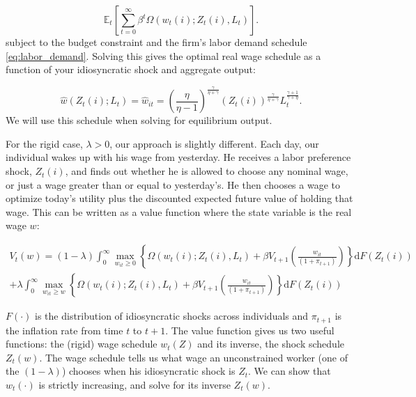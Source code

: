 \documentclass[12pt,a4paper]{scrartcl}            %
\begin{document}
\begin{equation}
    \label{eq:labor_opt}
    \mathbb{E}_t\left[\sum_{t=0}^{\infty}\beta^t \Omega( w_t(i); Z_t(i), L_t ) \right].
\end{equation}
%
subject to the budget constraint and the firm's labor demand schedule \eqref{eq:labor_demand}.
Solving this gives the optimal real wage schedule as a function of your idiosyncratic shock and aggregate output:

\begin{equation}
    \label{eq:flex}
    \hat{w}(Z_t(i); L_t) = \hat{w}_{it} = \left( \frac{\eta}{\eta - 1} \right)^{\frac{\gamma}{\eta + \gamma}}\left( Z_t(i) \right)^{\frac{\gamma}{\eta + \gamma}} L_t^{\frac{\gamma + 1}{\gamma + \eta}}.
\end{equation}
%
We will use this schedule when solving for equilibrium output.

For the rigid case, $\lambda > 0$, our approach is slightly different.
Each day, our individual wakes up with his wage from yesterday.
He receives a labor preference shock, $Z_t(i)$, and finds out whether he is allowed to choose any nominal wage, or just a wage greater than or equal to yesterday's.
He then chooses a wage to optimize today's utility plus the discounted expected future value of holding that wage.
This can be written as a value function where the state variable is the real wage $w$:

\begin{multline}
    \label{eq:value_function}
    V_t(w) = (1 - \lambda) \int_{0}^{\infty} \max_{w_{it} \geq 0} \left\{ \Omega( w_t(i); Z_t(i), L_t ) + \beta V_{t+1}\left( \frac{w_{it}}{(1 + \pi_{t+1})} \right) \right\} \mathrm{d}F(Z_t(i)) \\
                + \lambda  \int_{0}^{\infty} \max_{w_{it} \geq w} \left\{ \Omega( w_t(i); Z_t(i), L_t ) + \beta V_{t+1}\left( \frac{w_{it}}{(1 + \pi_{t+1})} \right) \right\} \mathrm{d}F(Z_t(i))
\end{multline}

$F(\cdot)$ is the distribution of idiosyncratic shocks across individuals and $\pi_{t+1}$ is the inflation rate from time $t$ to $t+1$.
The value function gives us two useful functions: the (rigid) wage schedule $w_t(Z)$ and its inverse, the shock schedule $Z_t(w)$.
The wage schedule tells us what wage an unconstrained worker (one of the $(1 - \lambda)$) chooses when his idiosyncratic shock is $Z_t$.
We can show that $w_t(\cdot)$ is strictly increasing, and solve for its inverse $Z_t(w)$.
\end{document}
